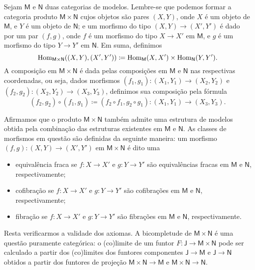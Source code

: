 \begin{exem}
  \label{exem:prod_categorias_de_modelos}
  Sejam $\mathsf{M}$ e $\mathsf{N}$ duas categorias de modelos.
  Lembre-se que podemos formar a categoria produto $\mathsf{M} \times \mathsf{N}$ cujos objetos são pares $(X,Y)$, onde $X$ é um objeto de $\mathsf{M}$, e $Y$ é um objeto de $\mathsf{N}$; e um morfismo do tipo $(X,Y) \to (X',Y')$ é dado por um par $(f,g)$, onde $f$ é um morfismo do tipo $X \to X'$ em $\mathsf{M}$, e $g$ é um morfismo do tipo $Y \to Y'$ em $\mathsf{N}$.
  Em suma, definimos
  \begin{displaymath}
    \mathrm{Hom}_{\mathsf{M} \times \mathsf{N}}((X,Y),(X',Y')) \coloneqq \mathrm{Hom}_\mathsf{M}(X,X') \times \mathrm{Hom}_\mathsf{N}(Y,Y').
  \end{displaymath}
  A composição em $\mathsf{M} \times \mathsf{N}$ é dada pelas composições em $\mathsf{M}$ e $\mathsf{N}$ nas respectivas coordenadas, ou seja, dados morfismos $(f_1,g_1): (X_1,Y_1) \to (X_2,Y_2)$ e $(f_2,g_2): (X_2,Y_2) \to (X_3,Y_3)$, definimos sua composição pela fórmula
  \begin{displaymath}
    (f_2,g_2) \circ (f_1,g_1) \coloneqq (f_2 \circ f_1,g_2 \circ g_1): (X_1,Y_1) \to (X_3,Y_3).
  \end{displaymath}

  Afirmamos que o produto $\mathsf{M} \times \mathsf{N}$ também admite uma estrutura de modelos obtida pela combinação das estruturas existentes em $\mathsf{M}$ e $\mathsf{N}$.
  As classes de morfismos em questão são definidas da seguinte maneira: um morfismo $(f,g): (X,Y) \to (X',Y')$ em $\mathsf{M} \times \mathsf{N}$ é dito uma
  \begin{itemize}
    \item equivalência fraca se $f: X \to X'$ e $g: Y \to Y'$ são equivalências fracas em $\mathsf{M}$ e $\mathsf{N}$, respectivamente;

    \item cofibração se $f: X \to X'$ e $g: Y \to Y'$ são cofibrações em $\mathsf{M}$ e $\mathsf{N}$, respectivamente;

    \item fibração se $f: X \to X'$ e $g: Y \to Y'$ são fibrações em $\mathsf{M}$ e $\mathsf{N}$, respectivamente.
  \end{itemize}

  Resta verificarmos a validade dos axiomas.
  A bicompletude de $\mathsf{M} \times \mathsf{N}$ é uma questão puramente categórica: o (co)limite de um funtor $F: \mathsf{J} \to \mathsf{M} \times \mathsf{N}$ pode ser calculado a partir dos (co)limites dos funtores componentes $\mathsf{J} \to \mathsf{M}$ e $\mathsf{J} \to \mathsf{N}$ obtidos a partir dos funtores de projeção $\mathsf{M} \times \mathsf{N} \to \mathsf{M}$ e $\mathsf{M} \times \mathsf{N} \to \mathsf{N}$.


\end{exem}
